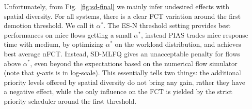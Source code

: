 Unfortunately, from Fig.~\ref{fig:sd-final} we mainly infer undesired effects with spatial diversity. For all systems, there is a clear FCT variation around the first demotion threshold. We call it $\alpha^{*}$. The ES-N threshold setting  provides best performances on mice flows getting a small $\alpha^{*}$, instead PIAS trades mice response time with medium, by optimizing $\alpha^*$ on the workload distribution, and achieves best average nFCT. Instead, SD-MLFQ gives an unacceptable penalty for flows above $\alpha^*$, even beyond the expectations based on the numerical flow simulator (note that $y$-axis is in log-scale). This essentially tells two things: the additional priority levels offered by spatial diversity do not bring any gain, rather they have a negative effect, while the only influence on the FCT is yielded by the strict priority scheduler around the first threshold. 

